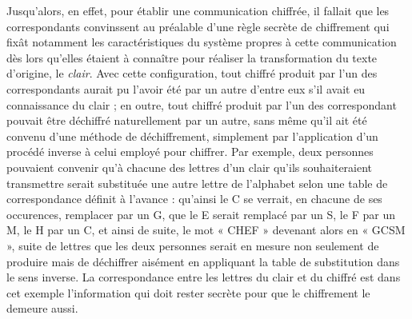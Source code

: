 Jusqu’alors, en effet, pour établir une communication chiffrée, il fallait que les correspondants
convinssent au préalable d’une règle secrète de chiffrement qui fixât
notamment les caractéristiques du système propres à cette communication dès lors qu’elles étaient à
connaître pour réaliser la transformation du texte d’origine, le {\it clair}.
Avec cette configuration, tout chiffré produit par l’un des correspondants aurait pu l’avoir été par
un autre d’entre eux s’il avait eu connaissance du clair ; en outre, tout chiffré produit par l’un
des correspondant pouvait être déchiffré naturellement par un autre, sans même qu’il ait été convenu
d’une méthode de déchiffrement, simplement par l’application d’un procédé inverse à celui employé
pour chiffrer.
Par exemple, deux personnes pouvaient convenir qu’à chacune des lettres d’un clair qu’ils
souhaiteraient transmettre serait substituée une autre lettre de l’alphabet selon une table de
correspondance définit à l’avance : qu’ainsi le {\sc C} se verrait, en chacune de ses occurences,
remplacer par un {\sc G}, que le {\sc E} serait remplacé par un {\sc S}, le {\sc F} par un {\sc M},
le {\sc H} par un {\sc C}, et ainsi de suite, le mot « CHEF » devenant alors en « GCSM », suite
de lettres que les deux personnes serait en mesure non seulement de produire mais de déchiffrer aisément en
appliquant la table de substitution dans le sens inverse. La correspondance entre les lettres du
clair et du chiffré est dans cet exemple l’information qui doit rester secrète pour que le
chiffrement le demeure aussi.


